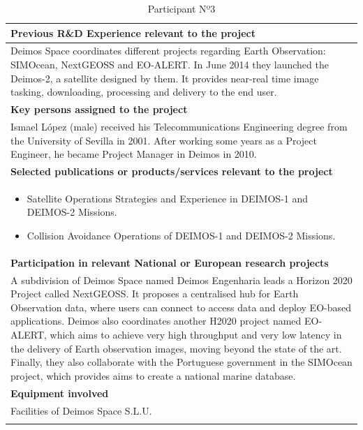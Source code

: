 \begin{longtable}[H]{|p{0.7cm}|p{4cm}|p{7cm}|p{1.3cm}|}
	\multicolumn{4}{|p{13cm}|}{\textbf{Previous R\&D Experience relevant to the project}}  \\ \hline
	
	\multicolumn{4}{|p{14.5cm}|}{Deimos Space coordinates different projects regarding Earth Observation: SIMOcean, NextGEOSS and EO-ALERT. In June 2014 they launched the Deimos-2, a satellite designed by them. It provides near-real time image tasking, downloading, processing and delivery to the end user.}  \\ \hline
	
	\multicolumn{4}{|p{13cm}|}{\textbf{Key persons assigned to the project}}   \\ \hline
	
	\multicolumn{4}{|p{14.5cm}|}{Ismael López (male) received his Telecommunications Engineering degree from the University of Sevilla in 2001. After working some years as a Project Engineer, he became Project Manager in Deimos in 2010. }  \\ \hline
	
	\multicolumn{4}{|p{13cm}|}{\textbf{Selected publications or products/services relevant to the project}}  \\ \hline
	
	\multicolumn{4}{|p{14.5cm}|}{
	\begin{itemize}
		\item Satellite Operations Strategies and Experience in DEIMOS-1 and DEIMOS-2 Missions.
		\item Collision Avoidance Operations of DEIMOS-1 and DEIMOS-2 Missions.
	\end{itemize}	}  \\ \hline
	
	\multicolumn{4}{|p{13cm}|}{\textbf{Participation in relevant National or European research projects}}  \\ \hline
	
	\multicolumn{4}{|p{14.5cm}|}{A subdivision of Deimos Space named Deimos Engenharia leads a Horizon 2020 Project called NextGEOSS. It proposes a centralised hub for Earth Observation data, where users can connect to access data and deploy EO-based applications. Deimos also coordinates another H2020 project named EO-ALERT, which aims to achieve very high throughput and very low latency in the delivery of Earth observation images, moving beyond the state of the art. Finally, they also collaborate with the Portuguese government in the SIMOcean project, which provides aims to create a national marine database.}  \\ \hline
	
	\multicolumn{4}{|p{13cm}|}{\textbf{Equipment involved}}  \\ \hline
	
	\multicolumn{4}{|p{14.5cm}|}{Facilities of Deimos Space S.L.U.}  \\ \hline
	\caption{Participant Nº3}
\end{longtable}



